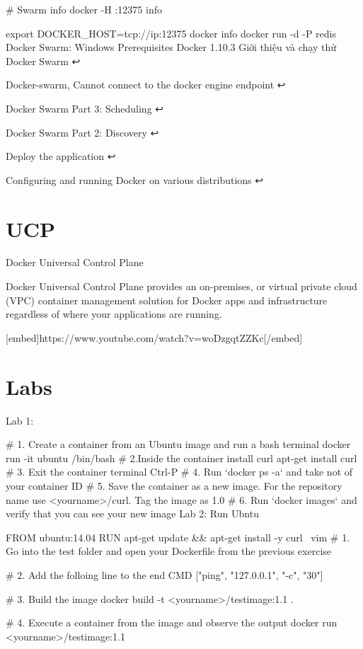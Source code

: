# Swarm info
docker -H :12375 info

export DOCKER_HOST=tcp://ip:12375
docker info
docker run -d -P redis
Docker Swarm: Windows
Prerequisites
Docker 1.10.3
Giới thiệu và chạy thử Docker Swarm ↩

Docker-swarm, Cannot connect to the docker engine endpoint ↩

Docker Swarm Part 3: Scheduling ↩

Docker Swarm Part 2: Discovery ↩

Deploy the application ↩

Configuring and running Docker on various distributions ↩

\section{UCP}

Docker Universal Control Plane

Docker Universal Control Plane provides an on-premises, or virtual private cloud (VPC) container management solution for Docker apps and infrastructure regardless of where your applications are running.

[embed]https://www.youtube.com/watch?v=woDzgqtZZKc[/embed]

\section{Labs}

Lab 1:

# 1. Create a container from an Ubuntu image and run a bash terminal
docker run -it ubuntu /bin/bash
# 2.Inside the container install curl
apt-get install curl
# 3. Exit the container terminal
Ctrl-P
# 4. Run `docker ps -a` and take not of your container ID
# 5. Save the container as a new image. For the repository name use <yourname>/curl. Tag the image as 1.0
# 6. Run `docker images` and verify that you can see your new image
Lab 2: Run Ubntu

FROM ubuntu:14.04
RUN apt-get update && apt-get install -y curl \ vim
# 1. Go into the test folder and open your Dockerfile from the previous exercise

# 2. Add the folloing line to the end
CMD ["ping", "127.0.0.1", "-c", "30"]

# 3. Build the image
docker build -t <yourname>/testimage:1.1 .

# 4. Execute a container from the image and observe the output
docker run <yourname>/testimage:1.1

